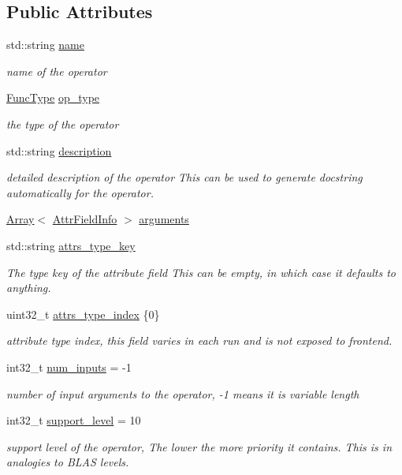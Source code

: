 \subsection*{Public Attributes}
\begin{DoxyCompactItemize}
\item 
std\+::string \hyperlink{classtvm_1_1OpNode_ae8810815c68a55b8b6ab00dfb7d7778d}{name}
\begin{DoxyCompactList}\small\item\em name of the operator \end{DoxyCompactList}\item 
\hyperlink{classtvm_1_1FuncType}{Func\+Type} \hyperlink{classtvm_1_1OpNode_adff89c1e3f0aa6798a97fc4461293f7c}{op\+\_\+type}
\begin{DoxyCompactList}\small\item\em the type of the operator \end{DoxyCompactList}\item 
std\+::string \hyperlink{classtvm_1_1OpNode_a95d402556bd6c710a0b38f50c8e5e3bc}{description}
\begin{DoxyCompactList}\small\item\em detailed description of the operator This can be used to generate docstring automatically for the operator. \end{DoxyCompactList}\item 
\hyperlink{classtvm_1_1Array}{Array}$<$ \hyperlink{classtvm_1_1AttrFieldInfo}{Attr\+Field\+Info} $>$ \hyperlink{classtvm_1_1OpNode_af753e9ea21f09017bb61d5722b2ce181}{arguments}
\item 
std\+::string \hyperlink{classtvm_1_1OpNode_aedeeca81655fb2bba9e1de79dcd539d1}{attrs\+\_\+type\+\_\+key}
\begin{DoxyCompactList}\small\item\em The type key of the attribute field This can be empty, in which case it defaults to anything. \end{DoxyCompactList}\item 
uint32\+\_\+t \hyperlink{classtvm_1_1OpNode_a4b7f1c6f18ede931328377bb8794c1bc}{attrs\+\_\+type\+\_\+index} \{0\}
\begin{DoxyCompactList}\small\item\em attribute type index, this field varies in each run and is not exposed to frontend. \end{DoxyCompactList}\item 
int32\+\_\+t \hyperlink{classtvm_1_1OpNode_aa13505588162bc5448bd03f02f5c545b}{num\+\_\+inputs} = -\/1
\begin{DoxyCompactList}\small\item\em number of input arguments to the operator, -\/1 means it is variable length \end{DoxyCompactList}\item 
int32\+\_\+t \hyperlink{classtvm_1_1OpNode_a68a34098b5a111dec5f381cc4a80cb78}{support\+\_\+level} = 10
\begin{DoxyCompactList}\small\item\em support level of the operator, The lower the more priority it contains. This is in analogies to B\+L\+AS levels. \end{DoxyCompactList}\end{DoxyCompactItemize}
